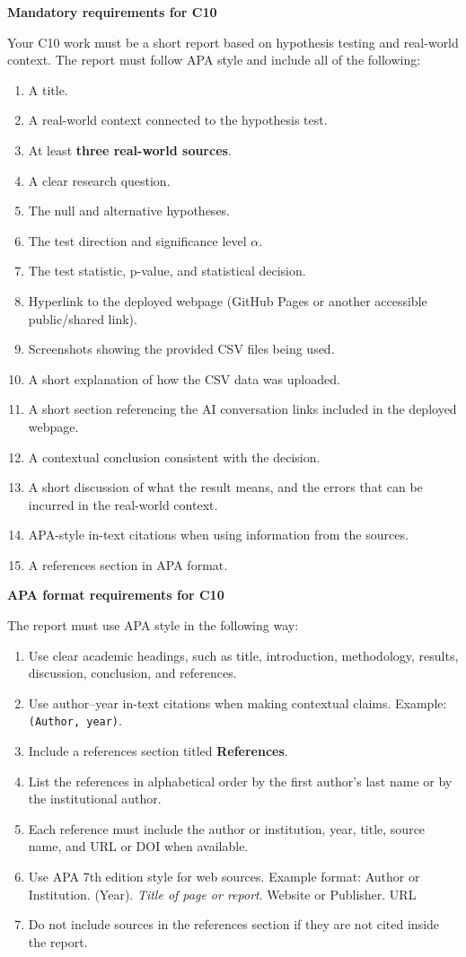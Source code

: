 \documentclass[12pt]{article}
\newcommand{\SubsectionBox}[1]{%
	\noindent\colorbox{gray!30}{%
		\parbox{\linewidth}{\textbf{#1}}%
	}\par\vspace{0.35cm}%
}
\begin{document}
	\SubsectionBox{Mandatory requirements for C10}
	Your C10 work must be a short report based on hypothesis testing and real-world context. The report must follow APA style and include all of the following:
	\begin{enumerate}
		\item A title.
		\item A real-world context connected to the hypothesis test.
		\item At least \textbf{three real-world sources}.
		\item A clear research question.
		\item The null and alternative hypotheses.
		\item The test direction and significance level \(\alpha\).
		\item The test statistic, p-value, and statistical decision.
		\item Hyperlink to the deployed webpage (GitHub Pages or another accessible public/shared link).
		\item Screenshots showing the provided CSV files being used.
		\item A short explanation of how the CSV data was uploaded.
		\item A short section referencing the AI conversation links included in the deployed webpage.
		\item A contextual conclusion consistent with the decision.
		\item A short discussion of what the result means, and the errors that can be incurred in the real-world context.
		\item APA-style in-text citations when using information from the sources.
		\item A references section in APA format.
	\end{enumerate}
	
	\SubsectionBox{APA format requirements for C10}
	The report must use APA style in the following way:
	\begin{enumerate}
		\item Use clear academic headings, such as title, introduction, methodology, results, discussion, conclusion, and references.
		\item Use author--year in-text citations when making contextual claims. Example: \texttt{(Author, year)}.
		\item Include a references section titled \textbf{References}.
		\item List the references in alphabetical order by the first author's last name or by the institutional author.
		\item Each reference must include the author or institution, year, title, source name, and URL or DOI when available.
		\item Use APA 7th edition style for web sources. Example format: Author or Institution. (Year). \textit{Title of page or report}. Website or Publisher. URL
		\item Do not include sources in the references section if they are not cited inside the report.
	\end{enumerate}
	
\end{document}
